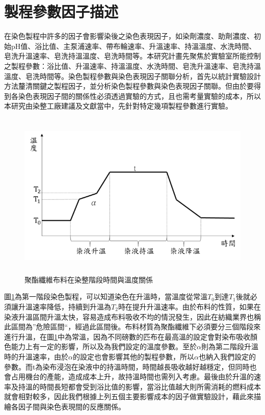 \section{製程參數因子描述}
\label{c:ch4.1}
在染色製程中許多的因子會影響染後之染色表現因子，如染劑濃度、助劑濃度、初始pH值、浴比值、主泵浦速率、帶布輪速率、升溫速率、持溫溫度、水洗時間、皂洗升溫速率、皂洗持溫溫度、皂洗時間等。本研究計畫先聚焦於實驗室所能控制之製程參數：浴比值、升溫速率、持溫溫度、水洗時間、皂洗升溫速率、皂洗持溫溫度、皂洗時間等。染色製程參數與染色表現因子關聯分析，首先以統計實驗設計方法釐清關鍵之製程因子，並分析染色製程參數與染色表現因子關聯。但由於要得到各染色表現因子間的關係性必須透過實驗的方式，且也需考量實驗的成本，所以本研究由染整工廠建議及文獻當中，先針對特定幾項製程參數進行實驗。
\begin{figure} 
\centering  
\includegraphics[width=12cm,height=8cm]{Graph/graph3.png}
\caption{聚酯纖維布料在染整階段時間與溫度關係}
\label{fig:graph3}
\end{figure}
圖\ref{fig:graph3}為第一階段染色製程，可以知道染色在升溫時，當溫度從常溫$T_0$到達$T_1$後就必須讓升溫速率降低，持續到升溫為$T_2$時在提升升溫速率。由於布料的性質，如果在染液升溫區間升溫太快，容易造成布料吸收不均的情況發生，因此在紡織業界也稱此區間為”危險區間“，經過此區間後。布料材質為聚酯纖維下必須要分三個階段來進行升溫，在圖\ref{fig:graph3}中為常溫，因為不同磅數的匹布在最高溫的設定會對染布吸收顏色能力上有一定的影響，所以及為我們設定的溫度參數。至於$\alpha$則為第二階段升溫時的升溫速率，由於$\alpha$的設定也會影響其他的製程參數，所以$\alpha$也納入我們設定的參數。而t為染布浸泡在染液中的持溫時間，時間越長吸收越好越穩定，但同時也會占用機台的產能，造成成本上升，故持溫時間也需列入考慮。最後由於升溫的速率及持溫的時間長短都會受到浴比值的影響，當浴比值越大則所需消耗的燃料成本就會相對較多，因此我們根據上列五個主要影響成本的因子做實驗設計，藉此來描繪各因子間與染色表現間的反應關係。

